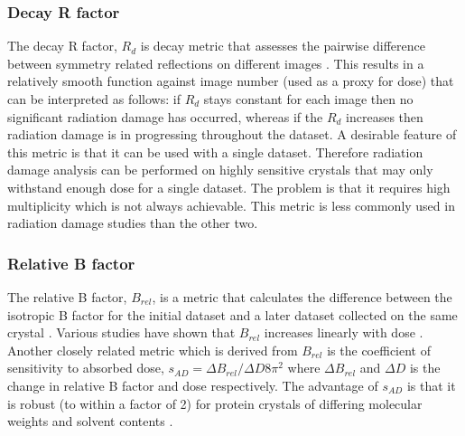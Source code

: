         \subsubsection{Decay R factor}
        \label{subs:Decay R factor}
            The decay R factor, $R_d$ is decay metric that assesses the pairwise difference between symmetry related reflections on different images \cite{diederichs2006}.
            This results in a relatively smooth function against image number (used as a proxy for dose) that can be interpreted as follows: if $R_d$ stays constant for each image then no significant radiation damage has occurred, whereas if the $R_d$ increases then radiation damage is in progressing throughout the dataset.
            A desirable feature of this metric is that it can be used with a single dataset.
            Therefore radiation damage analysis can be performed on highly sensitive crystals that may only withstand enough dose for a single dataset. 
			The problem is that it requires high multiplicity which is not always achievable. This metric is less commonly used in radiation damage studies than the other two.

        \subsubsection{Relative B factor}
        \label{subs:Relative B factor}
            The relative B factor, $B_{rel}$, is a metric that calculates the difference between the isotropic B factor for the initial dataset and a later dataset collected on the same crystal \cite{kmetko2006}.
            Various studies have shown that $B_{rel}$ increases linearly with dose \cite{kmetko2006,borek2007many,bourenkov2010optimization,leal2012}.
            Another closely related metric which is derived from $B_{rel}$ is the coefficient of sensitivity to absorbed dose, $s_{AD} = \Delta B_{rel} / \Delta D 8\pi^2$ where $\Delta B_{rel}$ and $\Delta D$ is the change in relative B factor and dose respectively. The advantage of $s_{AD}$ is that it is robust (to within a factor of 2) for protein crystals of differing molecular weights and solvent contents \cite{kmetko2006}.

